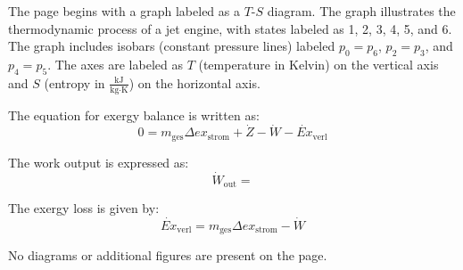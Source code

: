 The page begins with a graph labeled as a \( T \)-\( S \) diagram. The graph illustrates the thermodynamic process of a jet engine, with states labeled as 1, 2, 3, 4, 5, and 6. The graph includes isobars (constant pressure lines) labeled \( p_0 = p_6 \), \( p_2 = p_3 \), and \( p_4 = p_5 \). The axes are labeled as \( T \) (temperature in Kelvin) on the vertical axis and \( S \) (entropy in \( \frac{\text{kJ}}{\text{kg·K}} \)) on the horizontal axis.

The equation for exergy balance is written as:  
\[
0 = m_{\text{ges}} \Delta ex_{\text{strom}} + \dot{Z} - \dot{W} - \dot{Ex}_{\text{verl}}
\]  

The work output is expressed as:  
\[
\dot{W}_{\text{out}} =
\]  

The exergy loss is given by:  
\[
\dot{Ex}_{\text{verl}} = m_{\text{ges}} \Delta ex_{\text{strom}} - \dot{W}
\]  

No diagrams or additional figures are present on the page.